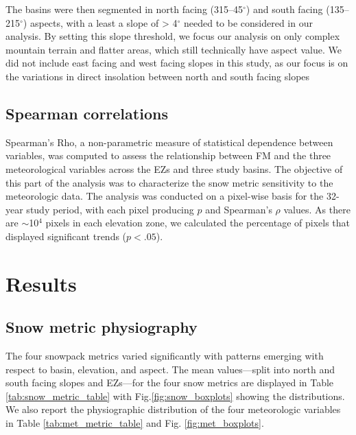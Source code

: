 The basins were then segmented in north facing (315--45$^{\circ}$) and south facing (135--215$^{\circ}$) aspects, with a least a slope of > 4$^{\circ}$ needed to be considered in our analysis. By setting this slope threshold, we focus our analysis on only complex mountain terrain and flatter areas, which still technically have aspect value. We did not include east facing and west facing slopes in this study, as our focus is on the variations in direct insolation between north and south facing slopes

\hypertarget{ch2-methods-3}{\subsection{Spearman correlations}\label{ch2-methods-3}}

Spearman's Rho, a non-parametric measure of statistical dependence between variables, was computed to assess the relationship between FM and the three meteorological variables across the EZs and three study basins. The objective of this part of the analysis was to characterize the snow metric sensitivity to the meteorologic data. The analysis was conducted on a pixel-wise basis for the 32-year study period, with each pixel producing $p$ and Spearman's $\rho$ values. As there are $\sim$10$^4$ pixels in each elevation zone, we calculated the percentage of pixels that displayed significant trends ($p < .05$).

\hypertarget{ch2-results}{\section{Results}\label{ch2-results}}
\hypertarget{ch2-results-1}{\subsection{Snow metric physiography}\label{ch2-results-1}}

The four snowpack metrics varied significantly with patterns emerging with respect to basin, elevation, and aspect. The mean values---split into north and south facing slopes and EZs---for the four snow metrics are displayed in Table \ref{tab:snow_metric_table} with Fig.\ref{fig:snow_boxplots} showing the distributions. We also report the physiographic distribution of the four meteorologic variables in Table \ref{tab:met_metric_table} and Fig. \ref{fig:met_boxplots}.

